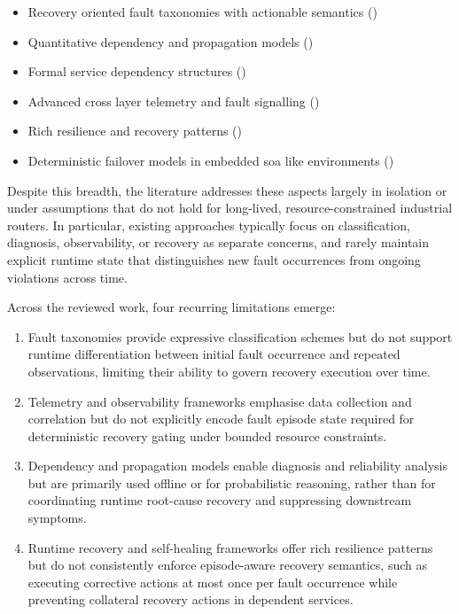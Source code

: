 \begin{itemize}
\item Recovery oriented fault taxonomies with actionable semantics (\cite{ref1,ref2})
\item Quantitative dependency and propagation models (\cite{ref8,ref7,ref9})
\item Formal service dependency structures (\cite{ref11,ref10,ref12})
\item Advanced cross layer telemetry and fault signalling (\cite{ref13,ref14,ref15})
\item Rich resilience and recovery patterns (\cite{ref17,ref18,ref19})
\item Deterministic failover models in embedded \gls{soa} like environments (\cite{ref25,ref23,ref24})
\end{itemize}

Despite this breadth, the literature addresses these aspects largely in isolation or under assumptions that do not hold for long-lived, resource-constrained industrial routers. In particular, existing approaches typically focus on classification, diagnosis, observability, or recovery as separate concerns, and rarely maintain explicit runtime state that distinguishes new fault occurrences from ongoing violations across time.

Across the reviewed work, four recurring limitations emerge:

\begin{enumerate}
\item Fault taxonomies provide expressive classification schemes but do not support runtime differentiation between initial fault occurrence and repeated observations, limiting their ability to govern recovery execution over time.
\item Telemetry and observability frameworks emphasise data collection and correlation but do not explicitly encode fault episode state required for deterministic recovery gating under bounded resource constraints.
\item Dependency and propagation models enable diagnosis and reliability analysis but are primarily used offline or for probabilistic reasoning, rather than for coordinating runtime root-cause recovery and suppressing downstream symptoms.
\item Runtime recovery and self-healing frameworks offer rich resilience patterns but do not consistently enforce episode-aware recovery semantics, such as executing corrective actions at most once per fault occurrence while preventing collateral recovery actions in dependent services.
\end{enumerate}

